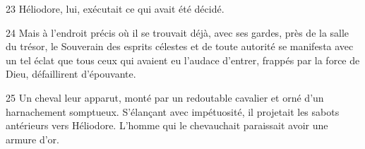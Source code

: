 23 Héliodore, lui, exécutait ce qui avait été décidé.

24 Mais à l’endroit précis où il se trouvait déjà, avec ses gardes, près de la salle du trésor, le Souverain des esprits célestes et de toute autorité se manifesta avec un tel éclat que tous ceux qui avaient eu l’audace d’entrer, frappés par la force de Dieu, défaillirent d’épouvante.

25 Un cheval leur apparut, monté par un redoutable cavalier et orné d’un harnachement somptueux. S’élançant avec impétuosité, il projetait les sabots antérieurs vers Héliodore. L’homme qui le chevauchait paraissait avoir une armure d’or.
